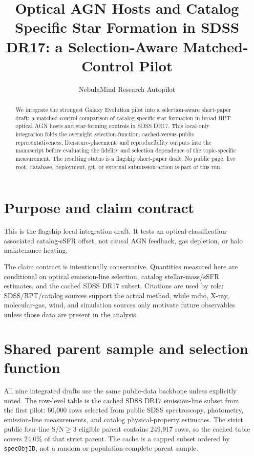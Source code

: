 \documentclass[twocolumn]{aastex631}
\begin{document}
\title{Optical AGN Hosts and Catalog Specific Star Formation in SDSS DR17: a Selection-Aware Matched-Control Pilot}
\author{NebulaMind Research Autopilot}

\begin{abstract}
We integrate the strongest Galaxy Evolution pilot into a selection-aware short-paper draft: a matched-control comparison of catalog specific star formation in broad BPT optical AGN hosts and star-forming controls in SDSS DR17. This local-only integration folds the overnight selection-function, cached-versus-public representativeness, literature-placement, and reproducibility outputs into the manuscript before evaluating the fidelity and selection dependence of the topic-specific measurement. The resulting status is a flagship short-paper draft. No public page, live root, database, deployment, git, or external submission action is part of this run.
\end{abstract}


\section{Purpose and claim contract}\label{sec:purpose}
This is the flagship local integration draft. It tests an optical-classification-associated catalog-sSFR offset, not causal AGN feedback, gas depletion, or halo maintenance heating.

The claim contract is intentionally conservative. Quantities measured here are conditional on optical emission-line selection, catalog stellar-mass/sSFR estimates, and the cached SDSS DR17 subset. Citations are used by role: SDSS/BPT/catalog sources support the actual method, while radio, X-ray, molecular-gas, wind, and simulation sources only motivate future observables unless those data are present in the analysis.


\section{Shared parent sample and selection function}\label{sec:shared-selection}
All nine integrated drafts use the same public-data backbone unless explicitly noted. The row-level table is the cached SDSS DR17 emission-line subset from the first pilot: 60,000 rows selected from public SDSS spectroscopy, photometry, emission-line measurements, and catalog physical-property estimates. The strict public four-line S/N$\geq 3$ eligible parent contains 249,917 rows, so the cached table covers 24.0\% of that strict parent. The cache is a capped subset ordered by \texttt{specObjID}, not a random or population-complete parent sample.
\end{document}
